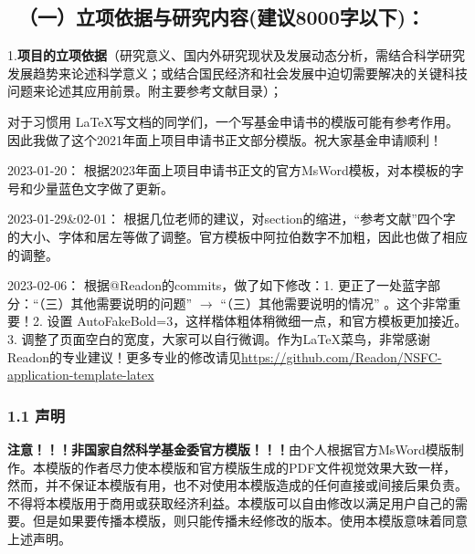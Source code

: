 {\color{MsBlue} \subsection{\sihao \kaishu \quad \ （一）立项依据与研究内容(建议8000字以下)： }}

{\sihao \kaishu \color{MsBlue} 1.{\bfseries 项目的立项依据}（研究意义、国内外研究现状及发展动态分析，需结合科学研究发展趋势来论述科学意义；或结合国民经济和社会发展中迫切需要解决的关键科技问题来论述其应用前景。附主要参考文献目录）；}

对于习惯用 \LaTeX 写文档的同学们，一个写基金申请书的模版可能有参考作用。因此我做了这个2021年面上项目申请书正文部分模版。祝大家基金申请顺利！

2023-01-20： 根据2023年面上项目申请书正文的官方MsWord模板，对本模板的字号和少量蓝色文字做了更新。

2023-01-29\&02-01： 根据几位老师的建议，对section的缩进，“参考文献”四个字的大小、字体和居左等做了调整。官方模板中阿拉伯数字不加粗，因此也做了相应的调整。




2023-02-06： 根据@Readon的commits，做了如下修改：1. 更正了一处蓝字部分：``（三）其他需要说明的问题'' $\rightarrow$ ``（三）其他需要说明的情况'' 。这个非常重要！2. 设置 AutoFakeBold=3，这样楷体粗体稍微细一点，和官方模板更加接近。3. 调整了页面空白的宽度，大家可以自行微调。作为\LaTeX 菜鸟，非常感谢Readon的专业建议！更多专业的修改请见\url{https://github.com/Readon/NSFC-application-template-latex}



\vskip 2mm
\subsubsection{1.1 声明}
{\bfseries \color{red} 注意！！！非国家自然科学基金委官方模版！！！}由个人根据官方MsWord模版制作。本模版的作者尽力使本模版和官方模版生成的PDF文件视觉效果大致一样，然而，并不保证本模版有用，也不对使用本模版造成的任何直接或间接后果负责。 不得将本模版用于商用或获取经济利益。本模版可以自由修改以满足用户自己的需要。但是如果要传播本模版，则只能传播未经修改的版本。使用本模版意味着同意上述声明。

